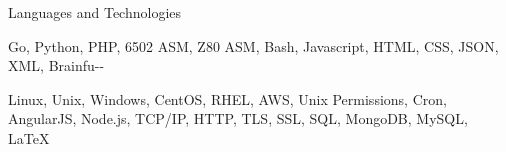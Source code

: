 \documentclass{resume} %
\begin{document}

\begin{rListSection}{Languages and Technologies}

\item Go, Python, PHP, 6502 ASM, Z80 ASM, Bash, Javascript, HTML, CSS, JSON, XML, Brainfu-{}-

\item Linux, Unix, Windows, CentOS, RHEL, AWS, Unix Permissions, Cron, AngularJS, Node.js, TCP/IP, HTTP, TLS, SSL, SQL, MongoDB, MySQL, \LaTeX

\end{rListSection}

\end{document}

